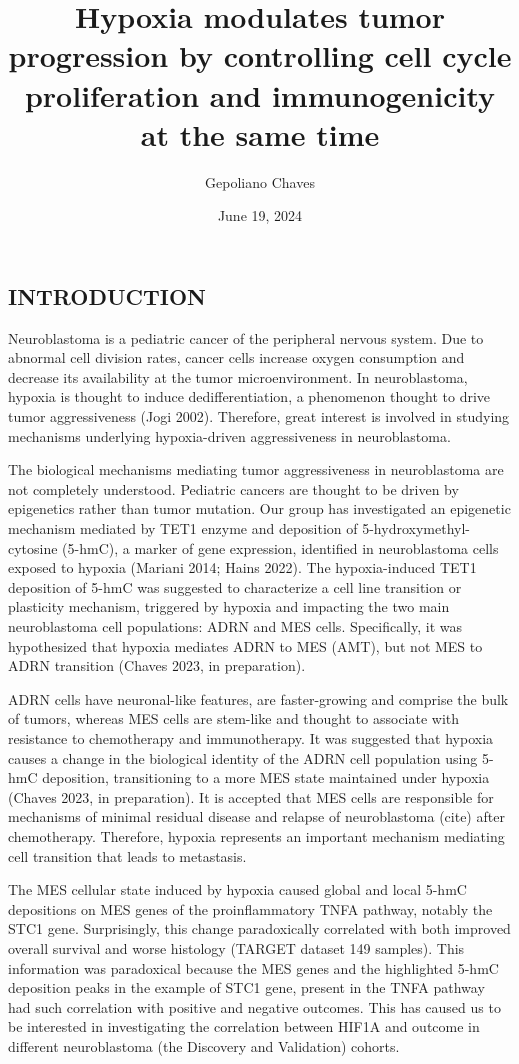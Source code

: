 \documentclass[
]{article}
\title{Hypoxia modulates tumor progression by controlling cell cycle
proliferation and immunogenicity at the same time}
\author{Gepoliano Chaves}
\date{June 19, 2024}
\begin{document}
\maketitle

\hypertarget{introduction}{%
\subsection{INTRODUCTION}\label{introduction}}

Neuroblastoma is a pediatric cancer of the peripheral nervous system.
Due to abnormal cell division rates, cancer cells increase oxygen
consumption and decrease its availability at the tumor microenvironment.
In neuroblastoma, hypoxia is thought to induce dedifferentiation, a
phenomenon thought to drive tumor aggressiveness (Jogi 2002). Therefore,
great interest is involved in studying mechanisms underlying
hypoxia-driven aggressiveness in neuroblastoma.

The biological mechanisms mediating tumor aggressiveness in
neuroblastoma are not completely understood. Pediatric cancers are
thought to be driven by epigenetics rather than tumor mutation. Our
group has investigated an epigenetic mechanism mediated by TET1 enzyme
and deposition of 5-hydroxymethyl-cytosine (5-hmC), a marker of gene
expression, identified in neuroblastoma cells exposed to hypoxia
(Mariani 2014; Hains 2022). The hypoxia-induced TET1 deposition of 5-hmC
was suggested to characterize a cell line transition or plasticity
mechanism, triggered by hypoxia and impacting the two main neuroblastoma
cell populations: ADRN and MES cells. Specifically, it was hypothesized
that hypoxia mediates ADRN to MES (AMT), but not MES to ADRN transition
(Chaves 2023, in preparation).

ADRN cells have neuronal-like features, are faster-growing and comprise
the bulk of tumors, whereas MES cells are stem-like and thought to
associate with resistance to chemotherapy and immunotherapy. It was
suggested that hypoxia causes a change in the biological identity of the
ADRN cell population using 5-hmC deposition, transitioning to a more MES
state maintained under hypoxia (Chaves 2023, in preparation). It is
accepted that MES cells are responsible for mechanisms of minimal
residual disease and relapse of neuroblastoma (cite) after chemotherapy.
Therefore, hypoxia represents an important mechanism mediating cell
transition that leads to metastasis.

The MES cellular state induced by hypoxia caused global and local 5-hmC
depositions on MES genes of the proinflammatory TNFA pathway, notably
the STC1 gene. Surprisingly, this change paradoxically correlated with
both improved overall survival and worse histology (TARGET dataset 149
samples). This information was paradoxical because the MES genes and the
highlighted 5-hmC deposition peaks in the example of STC1 gene, present
in the TNFA pathway had such correlation with positive and negative
outcomes. This has caused us to be interested in investigating the
correlation between HIF1A and outcome in different neuroblastoma (the
Discovery and Validation) cohorts.
\end{document}
